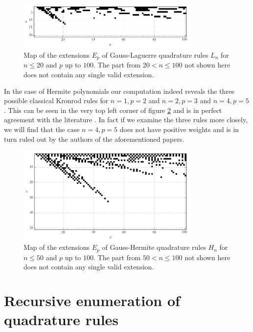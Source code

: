 \documentclass[a4paper,10pt]{article}
\begin{document}
\begin{figure}
  \centering
  \includegraphics[width=0.8\textwidth]{./img/map_lag_20_100.png}
  \caption{Map of the extensions $E_p$ of Gauss-Laguerre quadrature rules
           $L_n$ for $n \leq 20$ and $p$ up to $100$. The part from
           $20 < n \leq 100$ not shown here does not contain any single
           valid extension.}
  \label{fig:map_lag_20_100}
\end{figure}

In the case of Hermite polynomials our computation indeed reveals the three possible
classical Kronrod rules for $n=1, p=2$ and $n = 2, p = 3$ and $n = 4, p = 5$. This
can be seen in the very top left corner of figure \ref{fig:map_herm_50_100} and is
in perfect agreement with the literature \cite{monegato1976, kahaner-monegato, vladislav}.
In fact if we examine the three rules more closely, we will find that the case
$n = 4, p = 5$ does not have positive weights and is in turn ruled out by the
authors of the aforementioned papers.

\begin{figure}
  \centering
  \includegraphics[width=0.8\textwidth]{./img/map_herm_50_100.png}
  \caption{Map of the extensions $E_p$ of Gauss-Hermite quadrature rules
           $H_n$ for $n \leq 50$ and $p$ up to $100$. The part from
           $50 < n \leq 100$ not shown here does not contain any single
           valid extension.}
  \label{fig:map_herm_50_100}
\end{figure}


\FloatBarrier
\section{Recursive enumeration of quadrature rules}
\end{document}
